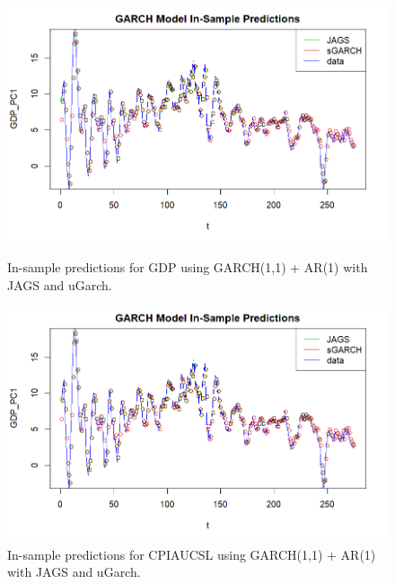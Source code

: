 \begin{figure}[H]
    \centering
    \begin{minipage}{0.49\textwidth}
        \centering
        \includegraphics[width=\textwidth]{images/5-GARCH/GARCH_predictions_gdp.png}
        \caption{In-sample predictions for GDP using GARCH(1,1) + AR(1) with JAGS and uGarch.}
        \label{fig:GARCH_gdp_prediction}
    \end{minipage}\hfill
    \begin{minipage}{0.49\textwidth}
        \centering
        \includegraphics[width=\textwidth]{images/5-GARCH/GARCH_predictions_gdp.png}
        \caption{In-sample predictions for CPIAUCSL using GARCH(1,1) + AR(1) with JAGS and uGarch.}
        \label{fig:GARCH_infl_prediction}
    \end{minipage}
\end{figure}
